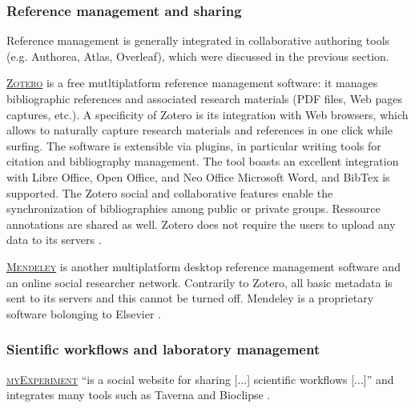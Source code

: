 %
%

\subsubsection{Reference management and sharing}

Reference management is generally integrated in collaborative authoring tools (e.g. Authorea, Atlas, Overleaf), which were discussed in the previous section.

\vspace{0.4cm}

\noindent {} \textsc{\href{https://www.zotero.org/}{Zotero}} is a free mutltiplatform reference management software: it manages bibliographic references and associated research materials (PDF files, Web pages captures, etc.). A specificity of Zotero is its integration with Web browsers, which allows to naturally capture research materials and references in one click while surfing. The software is extensible via plugins, in particular writing tools for citation and bibliography management. The tool boasts an excellent integration with Libre Office, Open Office, and Neo Office Microsoft Word, and BibTex is supported. The Zotero social and collaborative features enable the synchronization of bibliographies among public or private groups. Ressource annotations are shared as well. Zotero does not require the users to upload any data to its servers \cite{zotero.org_zotero_2015}.

\vspace{0.4cm}

\noindent {} \textsc{\href{https://www.mendeley.com/}{Mendeley}} is another multiplatform desktop reference management software and an online social researcher network. Contrarily to Zotero, all basic metadata is sent to its servers and this cannot be turned off. Mendeley is a proprietary software bolonging to Elsevier \cite{mendeley.com_mendeley_2015}. 

\subsubsection{Sientific workflows and laboratory management}

\noindent {} \textsc{\href{http://www.myexperiment.org}{myExperiment}} ``is a social website for sharing [...] scientific workflows [...]'' and integrates many tools such as Taverna and Bioclipse \cite{myexperiment_myexperiment_2014,myexperiment.org_myexperiment_2015}.

